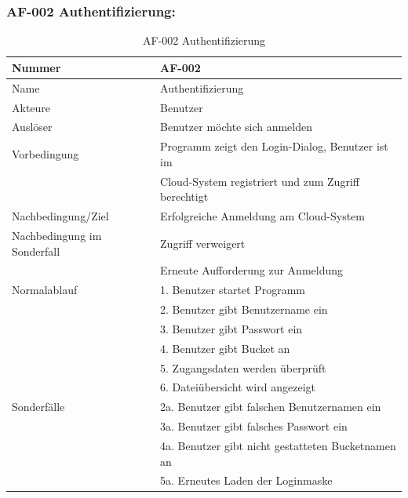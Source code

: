 \documentclass[13pt,a4paper,bibliography=totocnumbered,listof=totocnumbered]{scrartcl}
\begin{document}
\subsubsection{AF-002 Authentifizierung:}
\begin{table}[!h]
	\centering
	\begin{tabular}{|l|l|}
		\hline
		Nummer & AF-002\\
		\hline
		Name & Authentifizierung\\
		\hline
		Akteure & Benutzer\\
		\hline
		Auslöser & Benutzer möchte sich anmelden\\
		\hline
		Vorbedingung & Programm zeigt den Login-Dialog, Benutzer ist im \\ &  Cloud-System registriert und zum Zugriff berechtigt\\
		\hline
		Nachbedingung/Ziel & Erfolgreiche Anmeldung am Cloud-System \\
		\hline
		Nachbedingung im Sonderfall & Zugriff verweigert\\ & Erneute Aufforderung zur Anmeldung\\
		\hline
		Normalablauf & 1. Benutzer startet Programm \\ & 2. Benutzer gibt Benutzername ein \\ & 3. Benutzer gibt Passwort ein \\ & 4. Benutzer gibt Bucket an \\ &5. Zugangsdaten werden überprüft \\ & 6. Dateiübersicht wird angezeigt \\
		\hline
		Sonderfälle & 2a. Benutzer gibt falschen Benutzernamen ein \\ & 3a. Benutzer gibt falsches Passwort ein \\& 4a. Benutzer gibt nicht gestatteten Bucketnamen an\\ & 5a. Erneutes Laden der Loginmaske\\
		\hline
	\end{tabular}
	\caption{AF-002 Authentifizierung}
	\label{tab:AF-002 Authentifizierung}
\end{table}
\pagebreak
\end{document}
